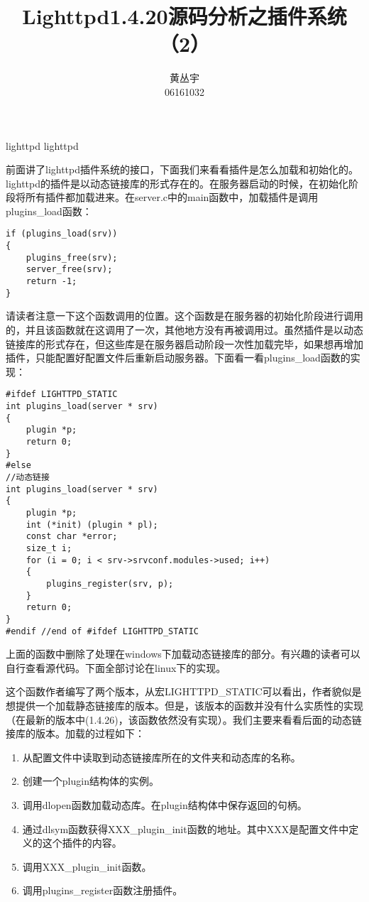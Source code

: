 \documentclass[12pt, a4paper, dvipdfm]{book}
\begin{document}
\title{Lighttpd1.4.20源码分析之插件系统（2）}
\author{黄丛宇\\06161032}
\maketitle

{\tnr lighttpd }
{\song lighttpd}

前面讲了lighttpd插件系统的接口，下面我们来看看插件是怎么加载和初始化的。lighttpd的插件是以动态链接库的形式存在的。在服务器启动的时候，在初始化阶段将所有插件都加载进来。在server.c中的main函数中，加载插件是调用plugins\_load函数：

\begin{verbatim}
if (plugins_load(srv))
{
	plugins_free(srv);
	server_free(srv);
	return -1;
}
\end{verbatim}

请读者注意一下这个函数调用的位置。这个函数是在服务器的初始化阶段进行调用的，并且该函数就在这调用了一次，其他地方没有再被调用过。虽然插件是以动态链接库的形式存在，但这些库是在服务器启动阶段一次性加载完毕，如果想再增加插件，只能配置好配置文件后重新启动服务器。下面看一看plugins\_load函数的实现：

\begin{verbatim}
#ifdef LIGHTTPD_STATIC
int plugins_load(server * srv)
{
	plugin *p;
	return 0;
}
#else
//动态链接
int plugins_load(server * srv)
{
	plugin *p;
	int (*init) (plugin * pl);
	const char *error;
	size_t i;
	for (i = 0; i < srv->srvconf.modules->used; i++)
	{
		plugins_register(srv, p);
	}
	return 0;
}
#endif //end of #ifdef LIGHTTPD_STATIC
\end{verbatim}

上面的函数中删除了处理在windows下加载动态链接库的部分。有兴趣的读者可以自行查看源代码。下面全部讨论在linux下的实现。

这个函数作者编写了两个版本，从宏LIGHTTPD\_STATIC可以看出，作者貌似是想提供一个加载静态链接库的版本。但是，该版本的函数并没有什么实质性的实现（在最新的版本中(1.4.26)，该函数依然没有实现）。我们主要来看看后面的动态链接库的版本。加载的过程如下：
\begin{enumerate}
	\item 从配置文件中读取到动态链接库所在的文件夹和动态库的名称。
	\item 创建一个plugin结构体的实例。
	\item 调用dlopen函数加载动态库。在plugin结构体中保存返回的句柄。
	\item 通过dlsym函数获得XXX\_plugin\_init函数的地址。其中XXX是配置文件中定义的这个插件的内容。
	\item 调用XXX\_plugin\_init函数。
	\item 调用plugins\_register函数注册插件。
\end{enumerate}
\end{document}
